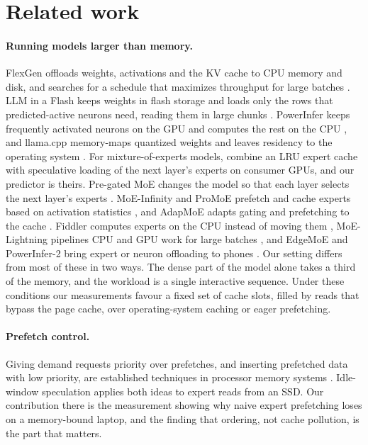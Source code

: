 \section{Related work}
\label{sec:related}
\paragraph{Running models larger than memory.} FlexGen offloads weights, activations and the KV cache to CPU memory and disk, and searches for a schedule that maximizes throughput for large batches \citep{flexgen}. LLM in a Flash keeps weights in flash storage and loads only the rows that predicted-active neurons need, reading them in large chunks \citep{llmflash}. PowerInfer keeps frequently activated neurons on the GPU and computes the rest on the CPU \citep{powerinfer}, and llama.cpp memory-maps quantized weights and leaves residency to the operating system \citep{llamacpp}. For mixture-of-experts models, \citet{moeoffload} combine an LRU expert cache with speculative loading of the next layer's experts on consumer GPUs, and our predictor is theirs. Pre-gated MoE changes the model so that each layer selects the next layer's experts \citep{pregated}. MoE-Infinity and ProMoE prefetch and cache experts based on activation statistics \citep{moeinfinity,promoe}, and AdapMoE adapts gating and prefetching to the cache \citep{adapmoe}. Fiddler computes experts on the CPU instead of moving them \citep{fiddler}, MoE-Lightning pipelines CPU and GPU work for large batches \citep{moelightning}, and EdgeMoE and PowerInfer-2 bring expert or neuron offloading to phones \citep{edgemoe,powerinfer2}. Our setting differs from most of these in two ways. The dense part of the model alone takes a third of the memory, and the workload is a single interactive sequence. Under these conditions our measurements favour a fixed set of cache slots, filled by reads that bypass the page cache, over operating-system caching or eager prefetching.

\paragraph{Prefetch control.} Giving demand requests priority over prefetches, and inserting prefetched data with low priority, are established techniques in processor memory systems \citep{padc,fdp,qureshi2007}. Idle-window speculation applies both ideas to expert reads from an SSD. Our contribution there is the measurement showing why naive expert prefetching loses on a memory-bound laptop, and the finding that ordering, not cache pollution, is the part that matters.

